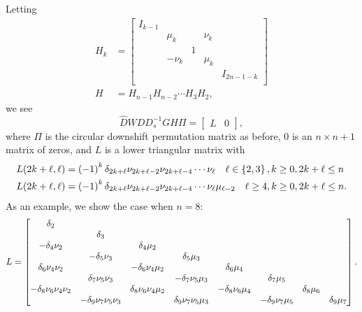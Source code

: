 \noindent
Letting
%
\begin{align}
    H_{k} &=
        \begin{bmatrix}
            I_{k-1} \\
            & \mu_{k} & & \nu_{k} \\
            & & 1 & \\
            & -\nu_{k} & & \mu_{k} \\
            & & & & I_{2n-1-k} \\
        \end{bmatrix} \nonumber\\
    H &= H_{n-1}H_{n-2}\cdots H_{3}H_{2},
\end{align}
%
we see
%
\begin{equation}
    \widehat{D}WDD_{s}^{-1}GH\Pi = \begin{bmatrix} L & 0 \end{bmatrix},
\end{equation}
%
where $\Pi$ is the circular downshift permutation matrix as before, $0$ is
an $n\times n+1$ matrix of zeros, and $L$ is a lower triangular matrix
with
%
\begin{align}
    L(2k+\ell,\ell) &= \left( -1 \right)^{k}\delta_{2k+\ell}\nu_{2k+\ell-2}
        \nu_{2k+\ell-4}\cdots\nu_{\ell} \quad \ell\in\left\{ 2,3 \right\},k\ge0,
        2k+\ell\le n
        \nonumber\\
    L(2k+\ell,\ell) &= \left( -1 \right)^{k}\delta_{2k+\ell}\nu_{2k+\ell-2}
        \nu_{2k+\ell-4}\cdots\nu_{\ell}\mu_{\ell-2} \quad \ell\ge4,k\ge0,
        2k+\ell\le n.
\end{align}
%
As an example, we show the case when $n=8$:
%
\begin{equation}
    L = \begin{bmatrix}
        \delta_{2} \\
        & \delta_{3} \\
        -\delta_{4}\nu_{2} & & \delta_{4}\mu_{2} \\
        & -\delta_{5}\nu_{3} & & \delta_{5}\mu_{3} \\
        \delta_{6}\nu_{4}\nu_{2} & & -\delta_{6}\nu_{4}\mu_{2} & & \delta_{6}\mu_{4}\\
        & \delta_{7}\nu_{5}\nu_{3}& & -\delta_{7}\nu_{5}\mu_{3} & &\delta_{7}\mu_{5}\\
        -\delta_{8}\nu_{6}\nu_{4}\nu_{2} & & \delta_{8}\nu_{6}\nu_{4}\mu_{2} & &
        -\delta_{8}\nu_{6}\mu_{4} & & \delta_{8}\mu_{6} \\
        & -\delta_{9}\nu_{7}\nu_{5}\nu_{3} & & \delta_{9}\nu_{7}\nu_{5}\mu_{3} & &
        -\delta_{9}\nu_{7}\mu_{5} & & \delta_{9}\mu_{7} \\
    \end{bmatrix}.
\end{equation}

